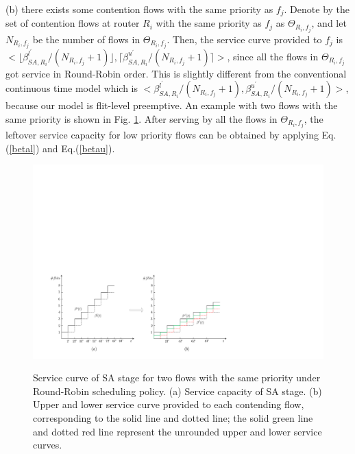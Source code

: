 \documentclass[10pt,journal]{IEEEtran}
\begin{document}
(b) there exists some contention flows with the same priority as $f_j$. Denote by the set of contention flows at router $R_i$ with the same priority as $f_j$ as $\Theta_{R_i,f_j}$, and let $N_{R_i,f_j}$ be the number of flows in $\Theta_{R_i,f_j}$. Then, the service curve provided to $f_j$ is $<\lfloor\beta^{l^\prime}_{SA,R_i}/(N_{R_i,f_j}+1)\rfloor,\lceil\beta^{u^\prime}_{SA,R_i}/(N_{R_i,f_j}+1)\rceil>$, since all the flows in $\Theta_{R_i,f_j}$ got service in Round-Robin order. This is slightly different from the conventional continuous time model which is $<\beta^{l^\prime}_{SA,R_i}/(N_{R_i,f_j}+1),\beta^{u^\prime}_{SA,R_i}/(N_{R_i,f_j}+1)>$, because our model is flit-level preemptive. An example with two flows with the same priority is shown in Fig. \ref{roundrobin}. After serving by all the flows in $\Theta_{R_i,f_j}$, the leftover service capacity for low priority flows can be obtained by applying Eq.(\ref{betal}) and Eq.(\ref{betau}).
\begin{figure}
  \centering
  \includegraphics[scale=0.5]{figures/RoundRobin.pdf}\\
  \caption{Service curve of SA stage for two flows with the same priority under Round-Robin scheduling policy. (a) Service capacity of SA stage. (b) Upper and lower service curve provided to each contending flow, corresponding to the solid line and dotted line; the solid green line and dotted red line represent the unrounded upper and lower service curves.}\label{roundrobin}
\end{figure}
\end{document}
